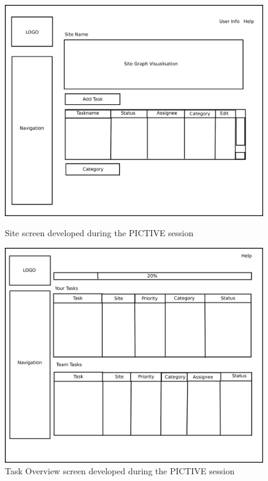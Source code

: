 \begin{figure}[!h]
\begin{minipage}[b]{0.48\textwidth}
    \begin{center}
        \includegraphics[scale=0.25]{figures/site.pdf}
    \end{center}
    \caption{Site screen developed during the PICTIVE session}
    \label{pictive_site}
\end{minipage}
\hspace{0.5cm}
\begin{minipage}[b]{0.48\textwidth}
    \begin{center}
        \includegraphics[scale=0.23]{figures/task_list.pdf}
    \end{center}
    \caption{Task Overview screen developed during the PICTIVE session}
    \label{pictive_tasks}
\end{minipage}
\end{figure}

